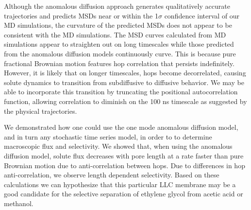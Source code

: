 \documentclass[journal=jctcce,manuscript=article]{achemso}
\begin{document}
  Although the anomalous diffusion approach generates qualitatively accurate 
  trajectories and predicts MSDs near or within the 1$\sigma$ confidence 
  interval of our MD simulations, the curvature of the predicted MSDs does not
  appear to be consistent with the MD simulations. The MSD curves calculated 
  from MD simulations appear to straighten out on long timescales while those 
  predicted from the anomalous diffusion models continuously curve. This is 
  because pure fractional Brownian motion features hop correlation that persists
  indefinitely. However, it is likely that on longer timescales, hops become
  decorrelated, causing solute dynamics to transition from subdiffusive to 
  diffusive behavior. We may be able to incorporate this transition by 
  truncating the positional autocorrelation function, allowing correlation to
  diminish on the 100 ns timescale as suggested by the physical trajectories.

  We demonstrated how one could use the one mode anomalous diffusion model, and
  in turn any stochastic time series model, in order to to determine macroscopic
  flux and selectivity. We showed that, when using the anomalous diffusion model,
  solute flux decreases with pore length at a rate faster than pure Brownian 
  motion due to anti-correlation between hops. Due to differences in hop 
  anti-correlation, we observe length dependent selectivity. Based on these 
  calculations we can hypothesize that this particular LLC membrane may be a good
  candidate for the selective separation of ethylene glycol from acetic acid or methanol.

  
\end{document}

